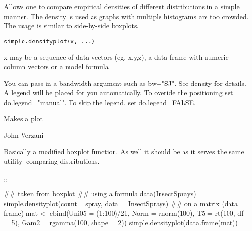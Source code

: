 \begin{Description}\relax
Allows one to compare empirical densities of different distributions
in a simple manner. The density is used as graphs with multiple
histograms are too crowded. The usage is similar to side-by-side boxplots.
\end{Description}
\begin{Usage}
\begin{verbatim}
simple.densityplot(x, ...)
\end{verbatim}
\end{Usage}
\begin{Arguments}
\begin{ldescription}
\item[\code{x}] x may be a sequence of data vectors (eg. x,y,z), a data frame 
with numeric column vectors or a model formula
\item[\code{...}] You can pass in a bandwidth argument such as bw="SJ". See 
density for details. A legend will be placed for you automatically. To 
overide the positioning set do.legend="manual". To skip the legend,
set do.legend=FALSE. 
\end{ldescription}
\end{Arguments}
\begin{Value}
Makes a plot
\end{Value}
\begin{Author}\relax
John Verzani
\end{Author}
\begin{References}\relax
Basically a modified boxplot function. As well it should be 
as it serves the same utility: comparing distributions.
\end{References}
\begin{SeeAlso}\relax
{},,
\end{SeeAlso}
\begin{Examples}
\begin{ExampleCode}
## taken from boxplot
## using a formula
data(InsectSprays)
simple.densityplot(count ~ spray, data = InsectSprays)
## on a matrix (data frame)
mat <- cbind(Uni05 = (1:100)/21, Norm = rnorm(100),
             T5 = rt(100, df = 5), Gam2 = rgamma(100, shape = 2))
simple.densityplot(data.frame(mat))

\end{ExampleCode}
\end{Examples}

